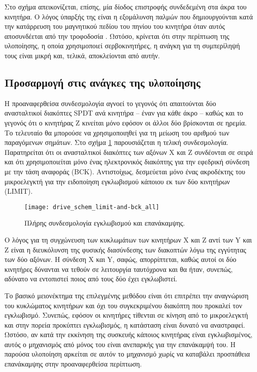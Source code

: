 Στο σχήμα απεικονίζεται, επίσης, μία δίοδος επιστροφής συνδεδεμένη στα άκρα του
κινητήρα. Ο λόγος ύπαρξής της είναι η εξομάλυνση παλμών που δημιουργούνται κατά
την κατάρρευση του μαγνητικού πεδίου του πηνίου του κινητήρα όταν αυτός
αποσυνδέεται από την τροφοδοσία \parencite[130--132]{kuphaldt09semi}. Ωστόσο,
κρίνεται ότι στην περίπτωση της υλοποίησης, η οποία χρησιμοποιεί σερβοκινητήρες,
η ανάγκη για τη συμπερίληψή τους είναι μικρή και, τελικά, αποκλείονται από
αυτήν.

\subsection{Προσαρμογή στις ανάγκες της υλοποίησης}

Η προαναφερθείσα συνδεσμολογία αγνοεί το γεγονός ότι απαιτούνται δύο
ανασταλτικοί διακόπτες SPDT ανά κινητήρα -- έναν για κάθε άκρο -- καθώς και το
γεγονός ότι ο κινητήρας Z κινείται μόνο εφόσον οι άλλοι δύο βρίσκονται σε
ηρεμία. Το τελευταίο θα μπορούσε να χρησιμοποιηθεί για τη μείωση του αριθμού των
παραγόμενων σημάτων. Στο σχήμα \ref{fig:motor:limit-switch_final} παρουσιάζεται
η τελική συνδεσμολογία. Παρατηρείται ότι οι ανασταλτικοί διακόπτες των αξόνων X
και Z συνδέονται σε σειρά και ότι χρησιμοποιείται μόνο ένας ηλεκτρονικός
διακόπτης για την εφεδρική σύνδεση με την τάση αναφοράς (BCK).
Αντιστοίχως, δεσμεύεται μόνο ένας ακροδέκτης του μικροελεγκτή για την ειδοποίηση
εγκλωβισμού κάποιου εκ των δύο κινητήρων (LIMIT).

\begin{figure}
    \caption{Πλήρης συνδεσμολογία εγκλωβισμού και επανάκαμψης.
    \label{fig:motor:limit-switch_final}}
    \begin{center}
    \texttt{[image: drive\_schem\_limit-and-bck\_all]}
    \end{center}
\end{figure}

Ο λόγος για τη συγχώνευση των κυκλωμάτων των κινητήρων X και Z αντί των Y και Z
είναι η διευκόλυνση της φυσικής διασύνδεσης των διακοπτών λόγω της εγγύτητας των
δύο αξόνων.
Η σύνδεση X και Y, σαφώς, απορρίπτεται, καθώς αυτοί οι δύο κινητήρες δύνανται να
τεθούν σε λειτουργία ταυτόχρονα και θα ήταν, συνεπώς, αδύνατο να εντοπιστεί
ποιος από τους δύο έχει εγκλωβιστεί.

Το βασικό μειονέκτημα της επιλεγμένης μεθόδου είναι ότι επιτρέπει την αναγνώριση
του κυκλώματος κινητήρων και όχι του συγκεκριμένου διακόπτη που προκαλεί τον
εγκλωβισμό. Συνεπώς, εφόσον οι κινητήρες τίθενται σε κίνηση από το μικροελεγκτή
και στην πορεία προκύπτει εγκλωβισμός, η κατάσταση είναι δυνατό να αναστραφεί.
Ωστόσο, αν κατά την εκκίνηση της συσκευής κάποιος κινητήρας είναι εγκλωβισμένος,
αυτός ο μηχανισμός από μόνος του είναι ανεπαρκής για την επανάκαμψή του. Η
παρούσα υλοποίηση αρκείται σε αυτόν το μηχανισμό χωρίς να καταβάλει προσπάθεια
επανάκαμψης στην προαναφερθείσα περίπτωση.

